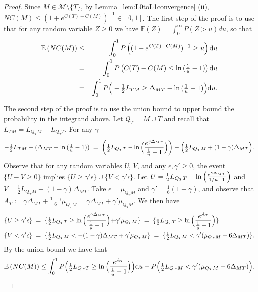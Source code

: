 \documentclass[
  12pt]{article}
\newcommand{\E}{\mathbb{E}}
\begin{document}
\begin{proof}
Since $M\in \mathcal M\setminus \{T\}$, by Lemma~\ref{lem:L0toL1convergence} (ii),  $NC(M)\leq (1+e^{C(T)-C(M)})^{-1} \in [0,1]$.  
The first step of the proof is to use that for any random variable $Z \geq 0$ we have $\E(Z)=\int_0^\infty P(Z>u) du$, so that
\begin{eqnarray*}
  \E\left(NC(M)\right)  &\leq& \int_0^1 P\left((1+e^{C(T)-C(M)})^{-1}\geq u\right){\rm d} u\\
  &=&\int_0^1 P\left(C(T)-C(M) \leq \ln{(\tfrac1u-1)}\right){\rm d}u\\
  &=&\int_0^1 P\Big(-\tfrac12 L_{TM} \geq \Delta_{MT}-\ln{(\tfrac1u-1)}\Big) {\rm d}u.
\end{eqnarray*}

The second step of the proof is to use the union bound to upper bound the probability in the integrand above.
Let $Q_T=M \cup T$ and recall that $L_{TM}=L_{Q_TM}-L_{Q_TT}$. For any $\gamma$ 
$$
-\tfrac12 L_{TM} -(\Delta_{MT}-\ln{(\tfrac1u-1)})\;=\;\left(\tfrac12 L_{Q_TT}-\ln{\Bigl(\frac{e^{\gamma\Delta_{MT}}}{\tfrac1u-1}\Bigl)}\right)-\Bigl(\tfrac12 L_{Q_TM}+(1-\gamma)\Delta_{MT}\Bigl).
$$
Observe that for any random variables $U$, $V$, and any $\epsilon,\gamma' \geq 0$, the event $
\{U-V \geq 0\}$ implies $\{U \geq \gamma' \epsilon\}\cup
\{V  < \gamma' \epsilon\}$. Let $U=\tfrac12 L_{Q_TT}-\ln{\Bigl(\frac{e^{\gamma\Delta_{MT}}}{1/u-1}\Bigl)}$ and $V=\tfrac12 L_{Q_TM}+(1-\gamma)\Delta_{MT}$. Take $\epsilon=\mu_{Q_TM}$ and $\gamma'=\tfrac16({1-\gamma})$, and observe that
$A_T:=\gamma\Delta_{MT}+\tfrac{1-\gamma}{6}\mu_{Q_TM}= \gamma\Delta_{MT}+\gamma'\mu_{Q_TM}$. We then have
\begin{align*}
\{U\geq \gamma'\epsilon\}\;&=\;\{\tfrac12 L_{Q_TT}\geq \ln{\Bigl(\frac{e^{\gamma\Delta_{MT}}}{\tfrac1u-1}}\Bigl)+\gamma'\mu_{Q_TM}\}\;=\;\{\tfrac12 L_{Q_TT}\geq \ln{\Bigl(\frac{e^{A_T}}{\tfrac1u-1}}\Bigl)\}\\
\{V<\gamma'\epsilon\}\;&=\;\{\tfrac12 L_{Q_TM}<-(1-\gamma)\Delta_{MT}+\gamma'\mu_{Q_TM}\}\;=\;\{\tfrac12 L_{Q_TM}<\gamma'(\mu_{Q_TM}-6\Delta_{MT})\}.
\end{align*}
By the union bound we have that
\begin{equation}\label{eq:prooflemmas20nonspu}
    \E\left(NC(M)\right)  \leq \int_0^1P\Bigl(\tfrac12 L_{Q_TT}\geq \ln{\Bigl(\frac{e^{A_T}}{\tfrac1u-1}\Bigl)}\Bigl){\rm d}u+ P\Bigl(\tfrac12 L_{Q_TM}<\gamma'(\mu_{Q_TM}-6\Delta_{MT})\Bigl).
\end{equation}


\end{proof}
\end{document}
